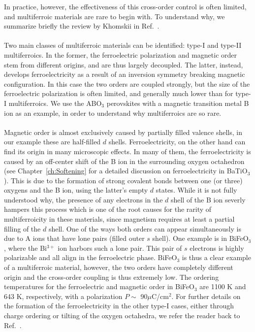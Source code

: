 In practice, however, the effectiveness of this cross-order control is often limited, and multiferroic materials are rare to begin with.
To understand why, we summarize briefly the review by Khomskii in Ref.~\cite{Khomskii2009}.
\\\\
Two main classes of multiferroic materials can be identified: type-I and type-II multiferroics.
In the former, the ferroelectric polarization and magnetic order stem from different origins, and are thus largely decoupled.
The latter, instead, develops ferroelectricity as a result of an inversion symmetry breaking magnetic configuration.
In this case the two orders are coupled strongly, but the size of the ferroelectric polarization is often limited, and generally much lower than for type-I multiferroics.
We use the ABO$_3$ perovskites with a magnetic transition metal B ion as an example, in order to understand why multiferroics are so rare.
\\\\
Magnetic order is almost exclusively caused by partially filled valence shells, in our example these are half-filled $d$ shells.
Ferroelectricity, on the other hand can find its origin in many microscopic effects.
In many of them, the ferroelectricity is caused by an off-center shift of the B ion in the surrounding oxygen octahedron (see Chapter~\ref{ch:Softening} for a detailed discussion on ferroelectricity in BaTiO$_3$).
This is due to the formation of strong covalent bonds between one (or three) oxygens and the B ion, using the latter's empty $d$ states. 
While it is not fully understood why, the presence of any electrons in the $d$ shell of the B ion severly hampers this process which is one of the root causes for the rarity of multiferroicity in these materials, since magnetism requires at least a partial filling of the $d$ shell.
One of the ways both orders can appear simultaneously is due to A ions that have lone pairs (filled outer $s$ shell). One example is in BiFeO$_3$, where the Bi$^{3+}$ ion harbors such a lone pair.
This pair of $s$ electrons is highly polarizable and all align in the ferroelectric phase.
BiFeO$_3$ is thus a clear example of a multiferroic material, however, the two orders have completely different origin and the cross-order coupling is thus extremely low.
The ordering temperatures for the ferroelectric and magnetic order in BiFeO$_3$ are 1100 K and 643 K, respectively, with a polarization $P \sim$ 90$\mu$C/cm$^2$.
For further details on the formation of the ferroelectricity in the other type-I cases, either through charge ordering or tilting of the oxygen octahedra, we refer the reader back to Ref.~\cite{Khomskii2009}.
